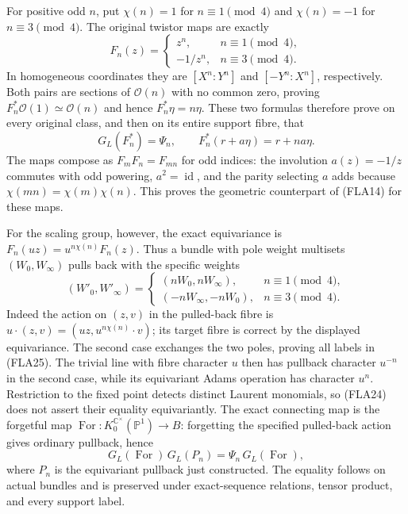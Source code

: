 For positive odd $n$, put $\chi(n)=1$ for $n\equiv1\pmod4$
and $\chi(n)=-1$ for $n\equiv3\pmod4$. The original twistor maps
are exactly
\begin{equation}\tag{FLA23}
 F_n(z)=
 \begin{cases}z^n,&n\equiv1\pmod4,\\-1/z^n,&n\equiv3\pmod4.
 \end{cases}
\end{equation}
In homogeneous coordinates they are $[X^n:Y^n]$ and
$[-Y^n:X^n]$, respectively. Both pairs are sections of
$\mathcal O(n)$ with no common zero, proving
$F_n^*\mathcal O(1)\simeq\mathcal O(n)$ and hence
$F_n^*\eta=n\eta$. These two formulas therefore prove on every
original class, and then on its entire support fibre, that
\begin{equation}\tag{FLA24}
 G_L(F_n^*)=\Psi_n,
 \qquad F_n^*(r+a\eta)=r+na\eta.
\end{equation}
The maps compose as $F_mF_n=F_{mn}$ for odd indices: the involution
$a(z)=-1/z$ commutes with odd powering, $a^2=\operatorname{id}$,
and the parity selecting $a$ adds because $\chi(mn)=\chi(m)\chi(n)$.
This proves the geometric counterpart of (FLA14) for these maps.

For the scaling group, however, the exact equivariance is
$F_n(u z)=u^{n\chi(n)}F_n(z)$. Thus a bundle with pole weight
multisets $(W_0,W_\infty)$ pulls back with the specific weights
\begin{equation}\tag{FLA25}
 (W'_0,W'_\infty)=
 \begin{cases}
 (nW_0,nW_\infty),&n\equiv1\pmod4,\\
 (-nW_\infty,-nW_0),&n\equiv3\pmod4.
 \end{cases}
\end{equation}
Indeed the action on $(z,v)$ in the pulled-back fibre is
$u\cdot(z,v)=(uz,u^{n\chi(n)}\cdot v)$; its target fibre is
correct by the displayed equivariance. The second case exchanges
the two poles, proving all labels in (FLA25). The trivial line
with fibre character $u$ then has pullback character $u^{-n}$
in the second case, while its equivariant Adams operation has
character $u^n$. Restriction to the fixed point detects distinct
Laurent monomials, so (FLA24) does not assert their equality
equivariantly. The exact connecting map is the forgetful map
$\operatorname{For}:K_0^{\mathbb C^\times}(\mathbb P^1)
\to B$: forgetting the specified pulled-back action gives ordinary
pullback, hence
\begin{equation}\tag{FLA26}
 G_L(\operatorname{For})\,G_L(P_n)
       =\Psi_n\,G_L(\operatorname{For}),
\end{equation}
where $P_n$ is the equivariant pullback just constructed.
The equality follows on actual bundles and is preserved under
exact-sequence relations, tensor product, and every support label.

